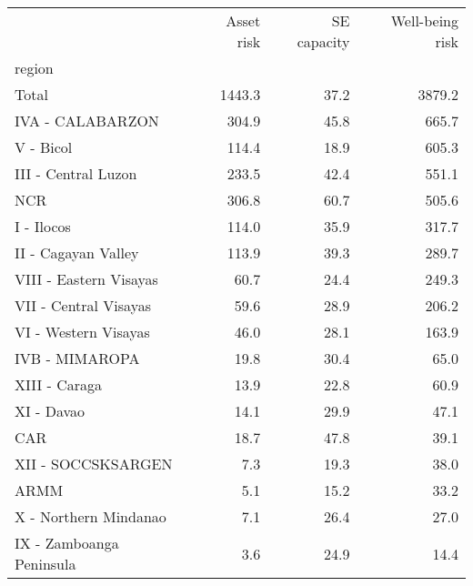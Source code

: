 \begin{tabular}{lrrr}
\toprule
{} &  Asset risk &  SE capacity &  Well-being risk \\
region                   &             &              &                  \\
\midrule
Total                    &      1443.3 &         37.2 &           3879.2 \\
IVA - CALABARZON         &       304.9 &         45.8 &            665.7 \\
V - Bicol                &       114.4 &         18.9 &            605.3 \\
III - Central Luzon      &       233.5 &         42.4 &            551.1 \\
NCR                      &       306.8 &         60.7 &            505.6 \\
I - Ilocos               &       114.0 &         35.9 &            317.7 \\
II - Cagayan Valley      &       113.9 &         39.3 &            289.7 \\
VIII - Eastern Visayas   &        60.7 &         24.4 &            249.3 \\
VII - Central Visayas    &        59.6 &         28.9 &            206.2 \\
VI - Western Visayas     &        46.0 &         28.1 &            163.9 \\
IVB - MIMAROPA           &        19.8 &         30.4 &             65.0 \\
XIII - Caraga            &        13.9 &         22.8 &             60.9 \\
XI - Davao               &        14.1 &         29.9 &             47.1 \\
CAR                      &        18.7 &         47.8 &             39.1 \\
XII - SOCCSKSARGEN       &         7.3 &         19.3 &             38.0 \\
ARMM                     &         5.1 &         15.2 &             33.2 \\
X - Northern Mindanao    &         7.1 &         26.4 &             27.0 \\
IX - Zamboanga Peninsula &         3.6 &         24.9 &             14.4 \\
\bottomrule
\end{tabular}

